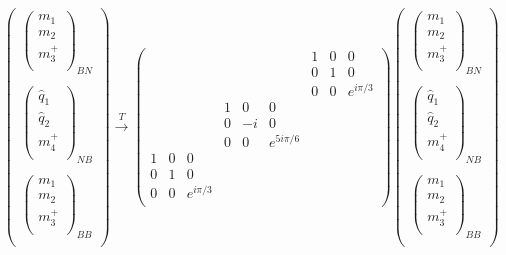 \begin{align}
\left(\begin{matrix}
\left( \begin{matrix}
{m}_1\\
{m}_2\\
m_3^+\\
\end{matrix} \right)_{BN} \\
\\
\left( \begin{matrix}
\widehat{{q}}_1\\
\widehat{{q}}_2\\
m_4^+\\
\end{matrix} \right)_{NB}\\
\\
\left( \begin{matrix}
{m}_1\\
{m}_2\\
m_3^+\\
\end{matrix} \right)_{BB} \\
\end{matrix} \right)
\xrightarrow{T} \left( \begin{matrix}
&&&			&&&			1&0&0	\\
&&&			&&&			0&1&0	\\
&&&			&&&			0&0&e^{i \pi/3}	\\
&&&			1&0&0&			&&	\\
&&&			0&-i&0&			&&	\\
&&&			0&0&e^{5 i \pi /6}&			&&	\\
1&0&0&			&&&			&&	\\
0&1&0&			&&&			&&	\\
0&0&e^{i \pi /3}&			&&&			&&	\\		
\end{matrix} \right)
\left(\begin{matrix}
\left( \begin{matrix}
{m}_1\\
{m}_2\\
m_3^+\\
\end{matrix} \right)_{BN} \\
\\
\left( \begin{matrix}
\widehat{{q}}_1\\
\widehat{{q}}_2\\
m_4^+\\
\end{matrix} \right)_{NB}\\
\\
\left( \begin{matrix}
{m}_1\\
{m}_2\\
m_3^+\\
\end{matrix} \right)_{BB} \\
\end{matrix} \right)
\end{align}
